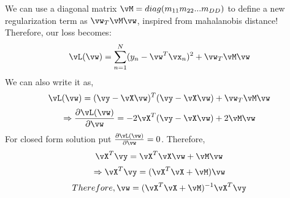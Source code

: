 \documentclass[a4paper,11pt]{article}
\begin{document}
\begin{mlsolution}

We can use a diagonal matrix $\vM = diag(m_{11} m_{22} . . . m_{DD})$ to define a new regularization term as $\vw_{T}\vM\vw$, inspired from mahalanobis distance!\\
Therefore, our loss becomes:
\begin{equation}
  \vL(\vw) = \sum_{n=1}^{N}(y_{n} - \vw^{T}\vx_{n})^2 + \vw_{T}\vM\vw
\end{equation}
We can also write it as,
\begin{equation}
  \vL(\vw) = (\vy - \vX\vw)^{T}(\vy - \vX\vw) + \vw_{T}\vM\vw
\end{equation}
\begin{equation}
  \Rightarrow \frac{\partial\vL(\vw)}{\partial\vw} = -2\vX^{T}(\vy - \vX\vw ) + 2\vM\vw
\end{equation}
For closed form solution put $\frac{\partial\vL(\vw)}{\partial\vw} = 0$. Therefore,
\begin{equation}
  \vX^{T}\vy = \vX^{T}\vX\vw + \vM\vw
\end{equation}
\begin{equation}
  \Rightarrow \vX^{T}\vy = (\vX^{T}\vX + \vM)\vw
\end{equation}
\begin{equation}
  Therefore, \vw = (\vX^{T}\vX + \vM)^{-1}\vX^{T}\vy
\end{equation}

\end{mlsolution}
\end{document}

